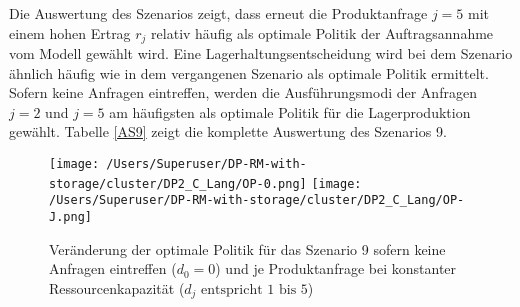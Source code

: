 Die Auswertung des Szenarios zeigt, dass erneut die Produktanfrage $j=5$ mit einem hohen Ertrag $r_j$ relativ häufig als optimale Politik der Auftragsannahme vom Modell gewählt wird. Eine Lagerhaltungsentscheidung wird bei dem Szenario ähnlich häufig wie in dem vergangenen Szenario als optimale Politik ermittelt. Sofern keine Anfragen eintreffen, werden die Ausführungsmodi der Anfragen $j=2$ und $j=5$ am häufigsten als optimale Politik für die Lagerproduktion gewählt. Tabelle \ref{AS9} zeigt die komplette Auswertung des Szenarios 9.

\begin{figure}[h!]     
\begin{center}
\texttt{[image: /Users/Superuser/DP-RM-with-storage/cluster/DP2\_C\_Lang/OP-0.png]}
\texttt{[image: /Users/Superuser/DP-RM-with-storage/cluster/DP2\_C\_Lang/OP-J.png]}
    \caption{Veränderung der optimale Politik für das Szenario 9 sofern keine Anfragen eintreffen ($d_0=0$) und je Produktanfrage bei konstanter Ressourcenkapazität ($d_j\text{ entspricht }1\text{ bis }5$)}  \label{SV9}
  \end{center}
\end{figure}
